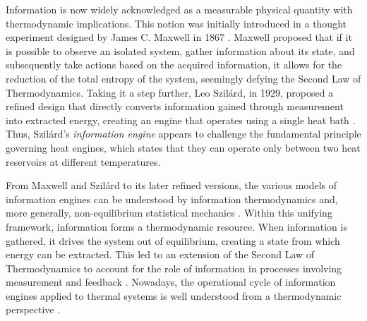 \documentclass[aps, twocolumn,floatfix,showpacs, superscriptaddress]{revtex4-2}
\newcommand{\ie}{information engines }
\begin{document}
Information is now widely acknowledged as a measurable physical quantity with thermodynamic implications. This notion was initially introduced in a thought experiment designed by James C. Maxwell in 1867 \cite{maxwell1871theory}. Maxwell proposed that if it is possible to observe an isolated system, gather information about its state, and subsequently take actions based on the acquired information, it allows for the reduction of the total entropy of the system, seemingly defying the Second Law of Thermodynamics.
Taking it a step further, Leo Szil\'ard, in 1929, proposed a refined design that directly converts information gained through measurement into extracted energy, creating an engine that operates using a single heat bath \cite{szilard1929entropieverminderung, szilard1964decrease}. Thus, Szil\'ard's \textit{information engine} appears to challenge the fundamental principle governing heat engines, which states that they can operate only between two heat reservoirs at different temperatures.

From Maxwell and Szil\'ard to its later refined versions, the various models of \ie can be understood by information thermodynamics and, more generally, non-equilibrium statistical mechanics \cite{Parrondo_2015, lutz_information_2015, paneru_colloidal_2020}.
Within this unifying framework, information forms a thermodynamic resource. When information is gathered, it drives the system out of equilibrium, creating a state from which energy can be extracted. This led to an extension of the Second Law of Thermodynamics to account for the role of information in processes involving measurement and feedback \cite{sagawa_generalized_2010, esposito_second_2011, ashida_general_2014}. Nowadays, the operational cycle of information engines applied to thermal systems is well understood from a thermodynamic perspective \cite{lutz_information_2015}.
\end{document}
